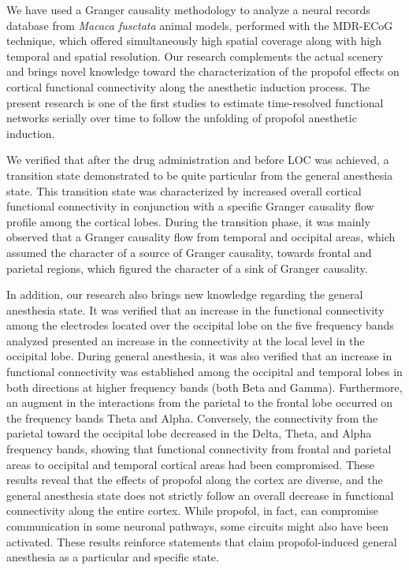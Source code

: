 \documentclass[twoside]{article}
\begin{document}
\begin{multicols}{2}
We have used a Granger causality methodology to analyze a neural records database from \textit{Macaca fusctata} animal models, performed with the MDR-ECoG technique, which offered simultaneously high spatial coverage along with high temporal and spatial resolution. Our research complements the actual scenery and brings novel knowledge toward the characterization of the propofol effects on cortical functional connectivity along the anesthetic induction process.
 The present research is one of the first studies to estimate time-resolved functional networks serially over time to follow the unfolding of propofol anesthetic induction.


We verified that after the drug administration and before LOC was achieved, a transition state demonstrated to be quite particular from the general anesthesia state. This transition state was characterized by increased overall cortical functional connectivity in conjunction with a specific Granger causality flow profile among the cortical lobes. During the transition phase, it was mainly observed that a Granger causality flow from temporal and occipital areas, which assumed the character of a source of Granger causality, towards frontal and parietal regions, which figured the character of a sink of Granger causality.  


In addition, our research also brings new knowledge regarding the general anesthesia state. It was verified that an increase in the functional connectivity among the electrodes located over the occipital lobe on the five frequency bands analyzed presented an increase in the connectivity at the local level in the occipital lobe. 
During general anesthesia, it was also verified that an increase in functional connectivity was established among the occipital and temporal lobes in both directions at higher frequency bands (both Beta and Gamma). Furthermore, an augment in the interactions from the parietal to the frontal lobe occurred on the frequency bands Theta and Alpha. Conversely, the connectivity from the parietal toward the occipital lobe decreased in the Delta, Theta, and Alpha frequency bands, showing that functional connectivity from frontal and parietal areas to occipital and temporal cortical areas had been compromised.
These results reveal that the effects of propofol along the cortex are diverse, and the general anesthesia state does not strictly follow an overall decrease in functional connectivity along the entire cortex. While propofol, in fact, can compromise communication in some neuronal pathways, some circuits might also have been activated. These results reinforce statements that claim propofol-induced general anesthesia as a particular and specific state.




\end{multicols}
\end{document}
